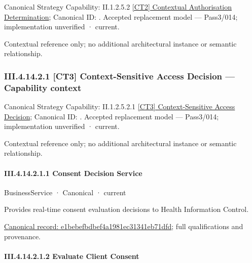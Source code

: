 {\small Canonical Strategy Capability: II.1.2.5.2 \hyperref[element:c8bd1d6e0796442a934a74cc69077543]{[CT2] Contextual Authorisation Determination}; Canonical ID: \texttt{}. Accepted replacement model — Pass3/014; implementation unverified · current.}\par
Contextual reference only; no additional architectural instance or semantic relationship.\par
\subsubsection*{III.4.14.2.1 [CT3] Context-Sensitive Access Decision — Capability context}
\label{navigation:III.4.14.2.1}

{\small Canonical Strategy Capability: II.1.2.5.2.1 \hyperref[element:8719d8ed49f940cfbba2d26ae14ea54d]{[CT3] Context-Sensitive Access Decision}; Canonical ID: \texttt{}. Accepted replacement model — Pass3/014; implementation unverified · current.}\par
Contextual reference only; no additional architectural instance or semantic relationship.\par
\paragraph*{III.4.14.2.1.1 Consent Decision Service}
\label{navigation:III.4.14.2.1.1}

\label{element:e1bebefbdbef4a1981ec31341eb71dfd}
{\small BusinessService · Canonical · current}\par

Provides real-time consent evaluation decisions to Health Information Control.


{\footnotesize \href{../../../../../../../../continuum/business/business-service/e1bebefbdbef4a1981ec31341eb71dfd.md}{Canonical record: e1bebefbdbef4a1981ec31341eb71dfd}; full qualifications and provenance.}\par
\paragraph*{III.4.14.2.1.2 Evaluate Client Consent}
\label{navigation:III.4.14.2.1.2}

